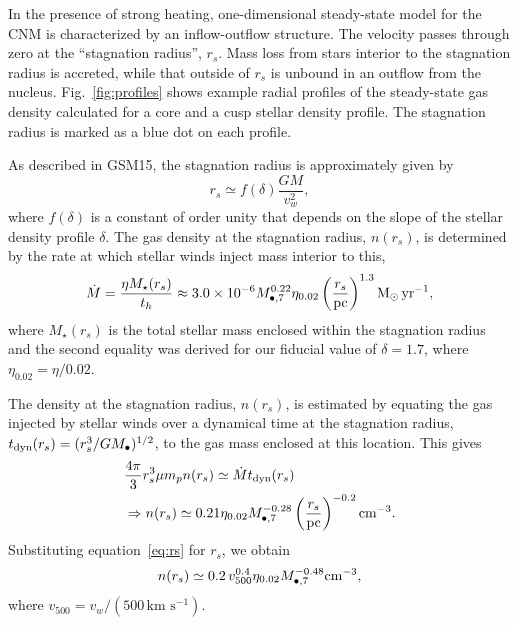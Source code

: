 \documentclass[usenatbib,fleqn]{mnras}
\newcommand{\Mbh}[1][]{M_{\bullet#1}}
\newcommand{\Msun}{{\rm M_\odot}}
\newcommand{\rs}{r_s}
\begin{document}
In the presence of strong heating, one-dimensional steady-state model for the CNM is characterized by an inflow-outflow structure.  The velocity passes through zero at the ``stagnation radius'', $\rs$.  Mass loss from stars interior to the stagnation radius is accreted, while that outside of $\rs$ is unbound in an outflow from the nucleus.  Fig.~\ref{fig:profiles} shows example radial profiles of the steady-state gas density calculated for a core and a cusp stellar density profile. The stagnation radius is marked as a blue dot on each profile.

As described in GSM15, the stagnation radius is approximately given by
\begin{equation}
r_s \simeq f(\delta) \frac{G M}{v_w^2},
\label{eq:rs}
\end{equation}
where $f(\delta)$ is a constant of order unity that depends on the slope of the stellar density profile $\delta$.  The gas density at the stagnation radius, $n(\rs)$, is determined by the rate at which stellar winds inject mass  interior to this,
\begin{equation}
\dot{M}=\frac{\eta M_{\rm \star}(\rs)}{t_h} \approx  3.0 \times 10^{-6} \Mbh[,7]^{0.22} \eta_{0.02} \left(\frac{r_s}{\rm
  pc}\right)^{1.3} \Msun \, {\rm yr}^{-1},
\label{eq:dotM}
\end{equation}
where $M_{\star}(\rs)$ is the total stellar mass enclosed within the stagnation radius and the second equality was derived for our fiducial value of $\delta=1.7$, where $\eta_{0.02}=\eta/0.02$.

The density at the stagnation radius, $n(\rs)$, is estimated by equating the gas injected by stellar winds over a dynamical time at the stagnation radius, $t_{\rm dyn} (\rs)=(\rs^3/G \Mbh)^{1/2}$, to the gas mass enclosed at this location.  This gives
\begin{align}
  &\frac{4 \pi}{3} \rs^3 \mu m_p n(r_s) \simeq \dot{M} t_{\rm dyn}
  (\rs) \nonumber\\
  &\Rightarrow n(r_s) \simeq 0.21 \eta_{0.02} \Mbh[,7]^{-0.28} \left(\frac{r_s}{\rm
      pc}\right)^{-0.2} {\rm cm}^{-3}.
\label{eq:nrs}
\end{align}
Substituting equation~\eqref{eq:rs} for $r_s$, we obtain 
\begin{equation}
n(r_s) \simeq 0.2 \, v_{500}^{0.4} \eta_{0.02} \Mbh[,7]^{-0.48} {\rm cm}^{-3},
\label{eq:nrs2}
\end{equation}
where $v_{500}=v_w/\left(500 \,\mathrm{km\,\,
    s^{-1}}\right)$. 
\end{document}
